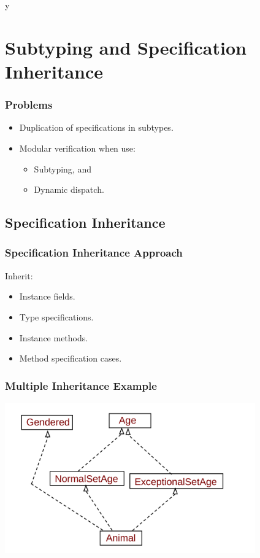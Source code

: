 \if y\MAKEHANDOUTS \documentclass[t,compress,landscape,handout]{beamer}
\begin{document}
\section[Subtypes]{Subtyping and Specification Inheritance}

\begin{frame}
\frametitle{Problems}
\begin{itemize}
\item
Duplication of specifications in subtypes.

\item
Modular verification when use:
\begin{itemize}
\item
Subtyping, and

\item
Dynamic dispatch.
\end{itemize}
\end{itemize}
\end{frame}

\subsection[Spec. Inh.]{Specification Inheritance}

\begin{frame}
\frametitle{Specification Inheritance Approach}

Inherit:
\begin{itemize}
\item
Instance fields.

\item
Type specifications.

\item
Instance methods.

\item
Method specification cases.
\end{itemize}
\end{frame}

\begin{frame}
\frametitle{Multiple Inheritance Example}
\includegraphics[width=4.25in]{multiple-inh}
\end{frame}
\end{document}
